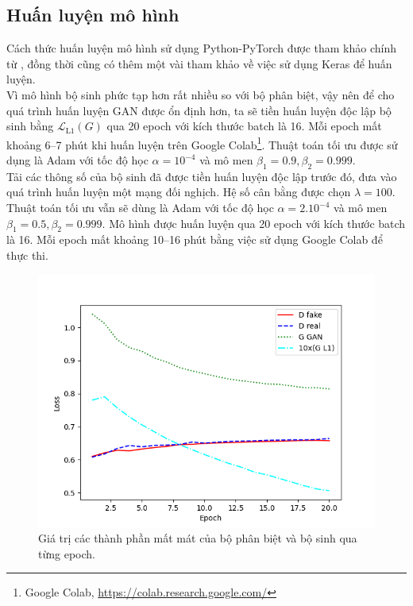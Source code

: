 \documentclass[a4paper, 12pt]{article}
\begin{document}
\subsection{Huấn luyện mô hình}
Cách thức huấn luyện mô hình sử dụng Python-PyTorch được tham khảo chính từ \cite{aladdinperssonyoutube, moeincolorization2020}, đồng thời cũng có thêm một vài tham khảo về việc sử dụng Keras \cite{tuannguyenpix2pix2020, khanhpix2pix2020, jasonpix2pix2019} để huấn luyện.\vspace{5pt}\\
Vì mô hình bộ sinh phức tạp hơn rất nhiều so với bộ phân biệt, vậy nên để cho quá trình huấn luyện GAN được ổn định hơn, ta sẽ tiền huấn luyện \cite{ham2020unbalanced} độc lập bộ sinh bằng $\mathcal{L}_{\text{L1}}(G)$ qua 20 epoch với kích thước batch là 16. Mỗi epoch mất khoảng 6--7 phút khi huấn luyện trên Google Colab\footnote{Google Colab, \href{https://colab.research.google.com/}{https://colab.research.google.com/}}. Thuật toán tối ưu được sử dụng là Adam \cite{kingma2017adam} với tốc độ học $\alpha = 10^{-4}$ và mô men $\beta_1 = 0.9, \beta_2=0.999$.\vspace{5pt}\\
Tải các thông số của bộ sinh đã được tiền huấn luyện độc lập trước đó, đưa vào quá trình huấn luyện một mạng đối nghịch. Hệ số cân bằng được chọn $\lambda=100$. Thuật toán tối ưu vẫn sẽ dùng là Adam với tốc độ học $\alpha=2.10^{-4}$ và mô men $\beta_1 = 0.5, \beta_2=0.999$. Mô hình được huấn luyện qua 20 epoch với kích thước batch là 16. Mỗi epoch mất khoảng 10--16 phút bằng việc sử dụng Google Colab để thực thi.

\begin{figure}[!h]
\captionsetup{width=0.8\textwidth}
\centering
\includegraphics[width=15cm]{images/3_6.png}
\caption{Giá trị các thành phần mất mát của bộ phân biệt và bộ sinh qua từng epoch.}
\end{figure}
\end{document}
